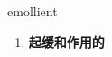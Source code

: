 
\begin{frame}
{\huge emollient}
\begin{center}
\begin{enumerate}\Large
  \item \textbf{起缓和作用的}
\end{enumerate}
\end{center}
\end{frame}
